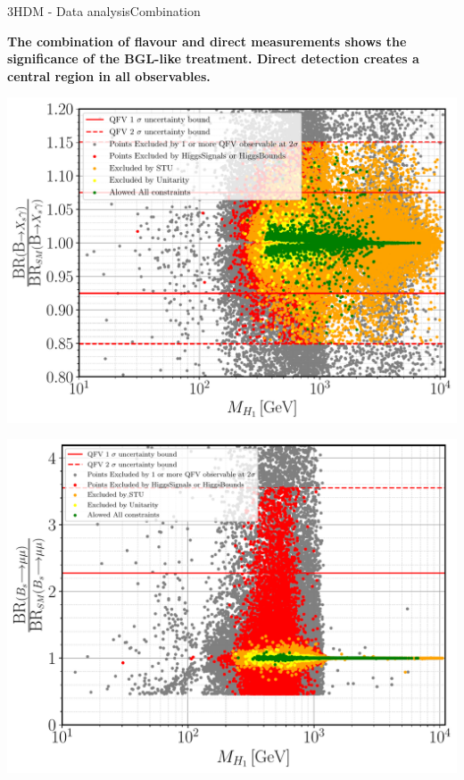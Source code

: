 \documentclass[10pt,xcolor=dvipsnames,mathserif]{beamer}
\begin{document}
\begin{frame}{3HDM - Data analysis}{Combination}

\begin{center}
{\bf The combination of flavour and direct measurements shows the significance of the BGL-like treatment. Direct detection creates a central region in all observables.   }
\end{center}

    \setlength{\tabcolsep}{6pt} %
\renewcommand{\arraystretch}{1} %

	\centering
	\begin{minipage}[t]{.32\textwidth}
	\centering
	\includegraphics[width=\textwidth]{Images/3HDM/PT_Folder/XsGamma_H1.pdf}  
	\end{minipage}
	\begin{minipage}[t]{.32\textwidth}
	\centering
	\includegraphics[width=\textwidth]{Images/3HDM/PT_Folder/Bsmumu_H1.pdf}   

\end{minipage}
\end{frame}
\end{document}
